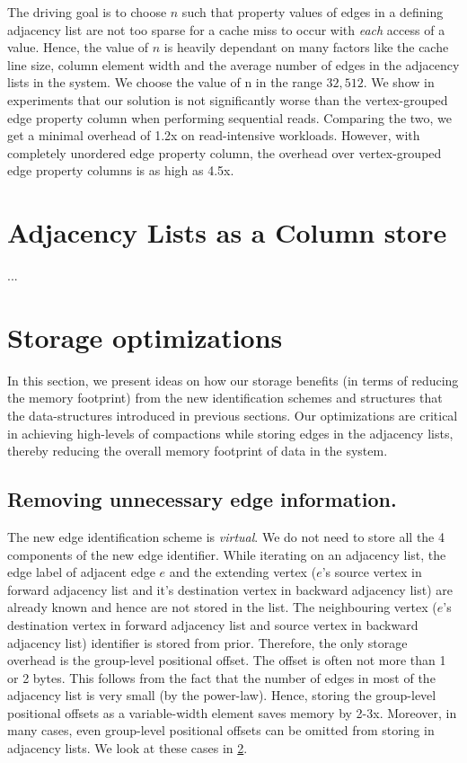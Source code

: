 The driving goal is to choose $n$ such that property values of edges in a defining adjacency list are not too sparse for a cache miss to occur with \emph{each} access of a value. Hence, the value of $n$ is heavily dependant on many factors like the cache line size, column element width and the average number of edges in the adjacency lists in the system. We choose the value of n in the range $32, 512$. We show in experiments that our solution is not significantly worse than the vertex-grouped edge property column when performing sequential reads. Comparing the two, we get a minimal overhead of 1.2x on read-intensive workloads. However, with completely unordered edge property column, the overhead over vertex-grouped edge property columns is as high as 4.5x.

\section{Adjacency Lists as a Column store}
\label{sec:adjacency-lists}

...

\section{Storage optimizations}
\label{sec:storage-optimizations}

In this section, we present ideas on how our storage benefits (in terms of reducing the memory footprint) from the new identification schemes and structures that the data-structures introduced in previous sections. Our optimizations are critical in achieving high-levels of compactions while storing edges in the adjacency lists, thereby reducing the overall memory footprint of data in the system.

\subsection{Removing unnecessary edge information.}

The new edge identification scheme is \emph{virtual}. We do not need to store all the 4 components of the new edge identifier. While iterating on an adjacency list, the edge label of adjacent edge $e$ and the extending vertex ($e$'s source vertex in forward adjacency list and it's destination vertex in backward adjacency list) are already known and hence are not stored in the list. The neighbouring vertex ($e$'s destination vertex in forward adjacency list and source vertex in backward adjacency list) identifier is stored from prior. Therefore, the only storage overhead is the group-level positional offset. The offset is often not more than 1 or 2 bytes. This follows from the fact that the number of edges in most of the adjacency list is very small (by the power-law). Hence, storing the group-level positional offsets as a variable-width element saves memory by 2-3x. Moreover, in many cases, even group-level positional offsets can be omitted from storing in adjacency lists. We look at these cases in \ref{sec:storage-optimizations}.

